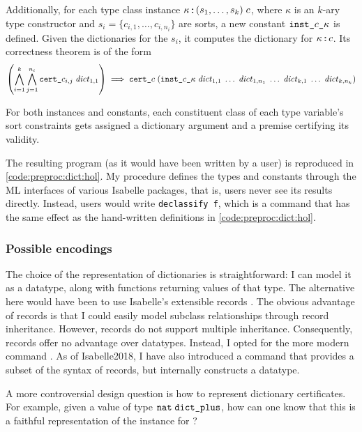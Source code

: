 Additionally, for each type class instance $\kappa \mathbin{:\!\!:} (s_1, \ldots, s_k)\;c$, where $\kappa$ is an $k$-ary type constructor and $s_i = \{c_{i,1}, \ldots, c_{i,n_i}\}$ are sorts, a new constant $\texttt{\textup{inst\_}}c\texttt{\textup{\_}}\kappa$ is defined.
Given the dictionaries for the $s_i$, it computes the dictionary for $\kappa \mathbin{:\!\!:} c$.
Its correctness theorem is of the form
\[
  \left(\bigwedge\limits_{i=1}^{k} \bigwedge\limits_{j=1}^{n_i} \texttt{\textup{cert\_}}c_{i,j}\;\mathit{dict}_{1,1}\right) \implies \texttt{\textup{cert\_}}c\;(\texttt{\textup{inst\_}}c\texttt{\textup{\_}}\kappa\;\mathit{dict}_{1,1}\;\ldots\;\mathit{dict}_{1,n_1}\;\ldots\;\mathit{dict}_{k,1}\;\ldots\;\mathit{dict}_{k,n_k})
\]

\noindent For both instances and constants, each constituent class of each type variable's sort constraints gets assigned a dictionary argument and a premise certifying its validity.

The resulting program (as it would have been written by a user) is reproduced in \cref{code:preproc:dict:hol}.
My procedure defines the types and constants through the ML interfaces of various Isabelle packages, that is, users never see its results directly.
Instead, users would write \lstinline~declassify f~, which is a command that has the same effect as the hand-written definitions in \cref{code:preproc:dict:hol}.

\subsubsection{Possible encodings}
\label{sec:preproc:dict:elim:encoding}

The choice of the representation of dictionaries is straightforward:
I can model it as a datatype, along with functions returning values of that type.
The alternative here would have been to use Isabelle's extensible records \cite{naraschewski1998record}.
The obvious advantage of records is that I could easily model subclass relationships through record inheritance.
However, records do not support multiple inheritance.
Consequently, records offer no advantage over datatypes.
Instead, I opted for the more modern  command \cite{blanchette2014datatypes}.
As of Isabelle2018, I have also introduced a  command that provides a subset of the syntax of records, but internally constructs a datatype.%

A more controversial design question is how to represent dictionary certificates.
For example, given a value of type $\texttt{\textup{nat}}\;\texttt{\textup{dict\_plus}}$, how can one know that this is a faithful representation of the  instance for ?

